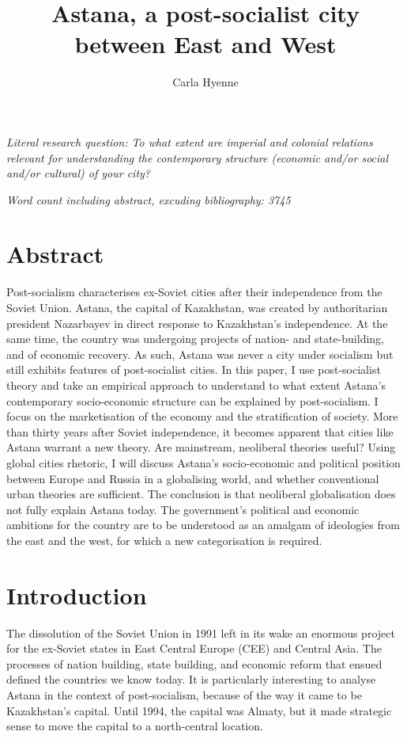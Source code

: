 \documentclass{article}
\title{Astana, a post-socialist city between East and West}
\author{Carla Hyenne}
\date{}
\begin{document}
\maketitle 

\begin{center}
\textit{Literal research question: To what extent are imperial and colonial relations relevant for understanding the contemporary structure (economic and/or social and/or cultural) of your city?}

\textit{Word count including abstract, excuding bibliography: 3745}

\end{center}

\section{Abstract}

Post-socialism characterises ex-Soviet cities after their independence from the Soviet Union.
Astana, the capital of Kazakhstan, was created by authoritarian president Nazarbayev in direct response to Kazakhstan's independence. At the same time, the country was undergoing projects of nation- and state-building, and of economic recovery. As such, Astana was never a city under socialism but still exhibits features of post-socialist cities. In this paper, I use post-socialist theory and take an empirical approach to understand to what extent Astana's contemporary socio-economic structure can be explained by post-socialism. 
I focus on the marketisation of the economy and the stratification of society. 
More than thirty years after Soviet independence, it becomes apparent that cities like Astana warrant a new theory. 
Are mainstream, neoliberal theories useful? Using global cities rhetoric, I will discuss Astana's socio-economic and political position between Europe and Russia in a globalising world, and whether conventional urban theories are sufficient. 
The conclusion is that neoliberal globalisation does not fully explain Astana today. The government's political and economic ambitions for the country are to be understood as an amalgam of ideologies from the east and the west, for which a new categorisation is required.

\section{Introduction}

The dissolution of the Soviet Union in 1991 left in its wake an enormous project for the ex-Soviet states in East Central Europe (CEE) and Central Asia. The processes of nation building, state building, and economic reform that ensued defined the countries we know today. It is particularly interesting to analyse Astana in the context of post-socialism, because of the way it came to be Kazakhstan's capital. 
Until 1994, the capital was Almaty, but it made strategic sense to move the capital to a north-central location. 
\end{document}
